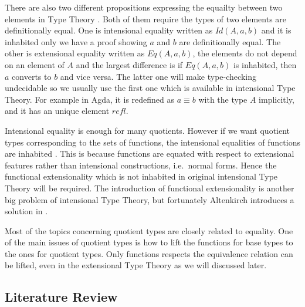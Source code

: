 \documentclass[envcountsame]{llncs}
\newcommand{\itt}{intensional Type Theory}
\begin{document}
There are also two different propositions expressing the equailty
between two elements in Type Theory \cite{nor:90}. Both of them
require the types of two elements are definitionally equal.
One is intensional equality written as $Id(A,a,b)$ and it is inhabited
only we have a proof showing $a$ and $b$ are definitionally equal. The
other is extensional equality written as $Eq(A,a,b)$, the elements
do not depend on an element of $A$ and the largest difference is if
$Eq(A,a,b)$ is inhabited, then $a$ converts to $b$ and vice versa. The
latter one will make type-checking undecidable so we usually use the
first one which is available in \itt{}. For example in Agda, it is
redefined as $a \equiv b$ with the type $A$ implicitly, and it has an
unique element $refl$.

Intensional equality is enough for many quotients. However if
we want quotient types corresponding to the sets of functions, the
intensional equalities of functions are inhabited \cite{alt:99}. This
is because functions are equated with respect to extensional features
rather than intensional constructions, i.e.~normal forms.
Hence the functional extensionality which is not inhabited in original \itt{}
will be required. The introduction of functional extensionality is
another big problem of \itt{}, but fortunately Altenkirch introduces a
solution in \cite{alt:99}.

Most of the topics concerning quotient types are closely related to equality.
One of the main issues of quotient types is how to lift the functions for
base types to the ones for quotient types. Only functions respects the
equivalence relation can be lifted, even in the extensional Type
Theory as we will discussed later.

\subsection{Literature Review}
\end{document}
